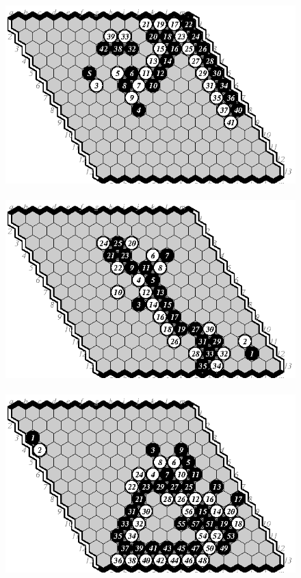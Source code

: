 \documentclass{IOS-Book-Article}
\begin{document}
\begin{figure}
\noindent\hspace*{-2cm}\
\includegraphics[scale=.9]{pix/13.hm1.eps}\hspace*{-1.8cm}\
\includegraphics[scale=.9]{pix/13.mh2.eps}\hspace*{-1.8cm}\
\includegraphics[scale=.9]{pix/13.eh1.eps}
\smallskip


\end{figure}
\end{document}
